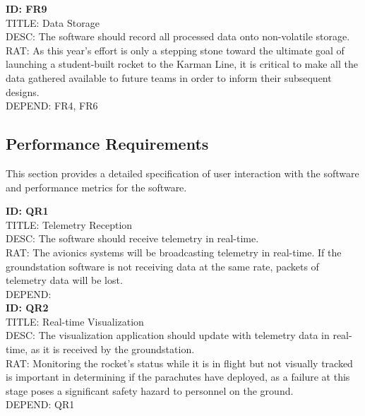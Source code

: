 \documentclass[onecolumn, draftclsnofoot,10pt, compsoc]{IEEEtran}
\begin{document}
			\noindent
			\textbf{ID: FR9}\\
			TITLE: Data Storage\\
			DESC: The software should record all processed data onto non-volatile storage.\\
			RAT: As this year's effort is only a stepping stone toward the ultimate goal of launching a student-built rocket to the Karman Line, it is critical to make all the data gathered available to future teams in order to inform their subsequent designs.\\
			DEPEND: FR4, FR6\\
		
		\subsection{Performance Requirements}
			This section provides a detailed specification of user interaction with the software and performance metrics for the software.
		
			\noindent
			\textbf{ID: QR1}\\
			TITLE: Telemetry Reception\\
			DESC: The software should receive telemetry in real-time.\\
			RAT: The avionics systems will be broadcasting telemetry in real-time. 
				If the groundstation software is not receiving data at the same rate, packets of telemetry data will be lost.\\
			DEPEND: \\
			
			\noindent
			\textbf{ID: QR2}\\
			TITLE: Real-time Visualization\\
			DESC: The visualization application should update with telemetry data in real-time, as it is received by the groundstation.\\
			RAT: Monitoring the rocket's status while it is in flight but not visually tracked is important in determining if the parachutes have deployed, as a failure at this stage poses a significant safety hazard to personnel on the ground. \\
			DEPEND: QR1\\
			
\end{document}
